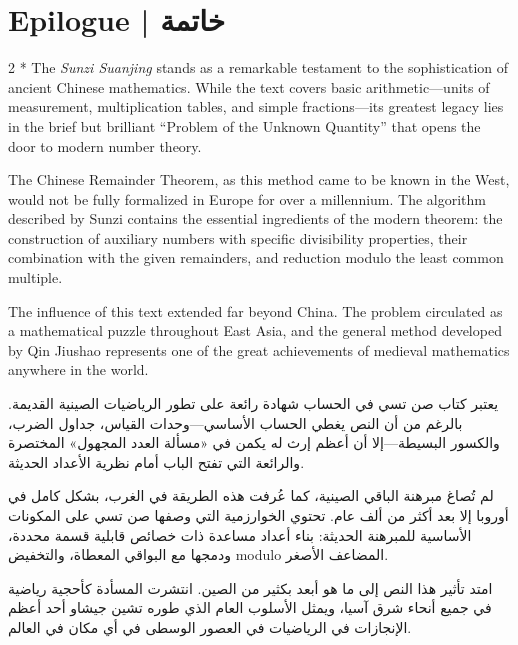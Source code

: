 \documentclass[11pt,a4paper]{article}
\newcommand{\ar}[1]{\arabicfont\beginR #1\endR}
\begin{document}
\newpage

\section*{Epilogue | \ar{خاتمة}}
\addcontentsline{toc}{section}{Epilogue | \ar{خاتمة}}

\begin{paracol}{2}
\switchcolumn[0]*\noindent
The \textit{Sunzi Suanjing} stands as a remarkable testament to the sophistication of ancient Chinese mathematics. While the text covers basic arithmetic---units of measurement, multiplication tables, and simple fractions---its greatest legacy lies in the brief but brilliant ``Problem of the Unknown Quantity'' that opens the door to modern number theory.

The Chinese Remainder Theorem, as this method came to be known in the West, would not be fully formalized in Europe for over a millennium. The algorithm described by Sunzi contains the essential ingredients of the modern theorem: the construction of auxiliary numbers with specific divisibility properties, their combination with the given remainders, and reduction modulo the least common multiple.

The influence of this text extended far beyond China. The problem circulated as a mathematical puzzle throughout East Asia, and the general method developed by Qin Jiushao represents one of the great achievements of medieval mathematics anywhere in the world.

\switchcolumn
\noindent
\ar{يعتبر كتاب صن تسي في الحساب شهادة رائعة على تطور الرياضيات الصينية القديمة. بالرغم من أن النص يغطي الحساب الأساسي—وحدات القياس، جداول الضرب، والكسور البسيطة—إلا أن أعظم إرث له يكمن في «مسألة العدد المجهول» المختصرة والرائعة التي تفتح الباب أمام نظرية الأعداد الحديثة.}

\ar{لم تُصاغ مبرهنة الباقي الصينية، كما عُرفت هذه الطريقة في الغرب، بشكل كامل في أوروبا إلا بعد أكثر من ألف عام. تحتوي الخوارزمية التي وصفها صن تسي على المكونات الأساسية للمبرهنة الحديثة: بناء أعداد مساعدة ذات خصائص قابلية قسمة محددة، ودمجها مع البواقي المعطاة، والتخفيض modulo المضاعف الأصغر.}

\ar{امتد تأثير هذا النص إلى ما هو أبعد بكثير من الصين. انتشرت المسأدة كأحجية رياضية في جميع أنحاء شرق آسيا، ويمثل الأسلوب العام الذي طوره تشين جيشاو أحد أعظم الإنجازات في الرياضيات في العصور الوسطى في أي مكان في العالم.}
\end{paracol}
\end{document}
